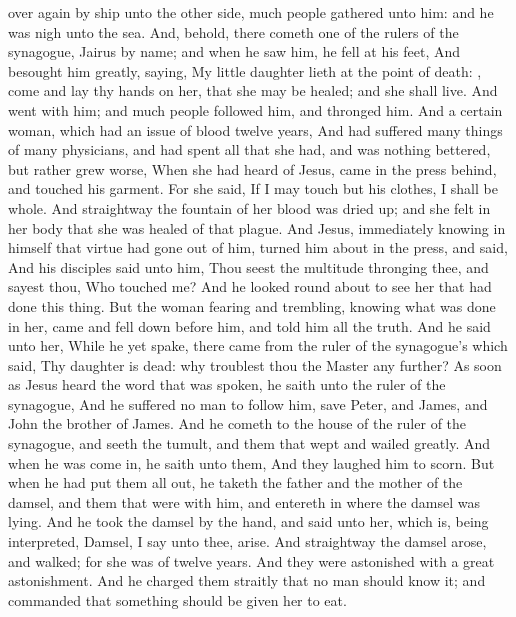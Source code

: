 {over
again
by
ship
unto the other
side,
much
people
gathered
unto
him:
and he
was nigh
unto the
sea.
And,
behold, there
cometh
one of the rulers of the
synagogue,
Jairus by
name;
and when he
saw
him, he
fell
at
his
feet,
And
besought
him
greatly,
saying,
My little
daughter
lieth at the point of
death:
{},
come and
lay thy
hands on
her,
that she may be
healed;
and she shall
live.
And
{}
went
with
him;
and
much
people
followed
him,
and
thronged
him.
And
a
certain
woman, which
had an
issue of
blood
twelve
years,
And had
suffered many
things
of
many
physicians,
and had
spent
all
that
she
had,
and
was
nothing
bettered,
but
rather
grew
worse,
When she had
heard
of
Jesus,
came
in the
press
behind, and
touched
his
garment.
For she
said,
If I may
touch
but
his
clothes, I shall be
whole.
And
straightway the
fountain
of
her
blood was dried
up;
and she
felt in her
body
that she was
healed
of that
plague.
And
Jesus,
immediately
knowing
in
himself
that
virtue had gone
out
of
him, turned him
about
in the
press, and
said,
{}
And
his
disciples
said unto
him, Thou
seest the
multitude
thronging
thee,
and sayest
thou,
Who
touched
me?
And he looked round
about to
see her that had
done this
thing.
But the
woman
fearing
and
trembling,
knowing
what was
done
in
her,
came
and fell down
before
him,
and
told
him
all the
truth.
And he
said unto
her,
{}
While
he
yet
spake, there
came
from the ruler of the
synagogue’s
{} which
said,
Thy
daughter is
dead:
why troublest
thou the
Master any
further?
As soon
as
Jesus
heard the
word that was
spoken, he
saith unto the ruler of the
synagogue,
{}
And he
suffered no
man to
follow
him,
save
Peter,
and
James,
and
John the
brother of
James.
And he
cometh
to the
house of the ruler of the
synagogue,
and
seeth the
tumult, and them that
wept
and
wailed
greatly.
And when he was come
in, he
saith unto
them,
{}
And they
laughed
him to
scorn.
But when he had put
them
all
out, he
taketh the
father
and the
mother of the
damsel,
and them that were
with
him,
and entereth
in
where the
damsel
was
lying.
And he
took the
damsel by the
hand, and
said unto
her,
{}
which
is, being
interpreted,
Damsel, I
say unto
thee,
arise.
And
straightway the
damsel
arose,
and
walked;
for she
was
{}
of
twelve
years.
And they were
astonished
with a
great
astonishment.
And he
charged
them
straitly
that no
man should
know
it;
and
commanded that something should be
given
her to
eat.

}
